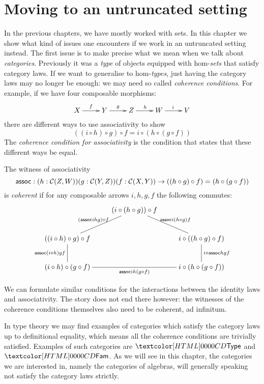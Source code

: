 \chapter{Moving to an untruncated setting}

In the previous chapters, we have mostly worked with sets. In this
chapter we show what kind of issues one encounters if we work in an
untruncated setting instead. The first issue is to make precise what
we mean when we talk about \emph{categories}. Previously it was a
\emph{type} of objects equipped with hom-\emph{sets} that satisfy
category laws. If we want to generalise to hom-\emph{types}, just
having the category laws may no longer be enough: we may need so
called \emph{coherence conditions}. For example, if we have four
composable morphisms:
$$
\xymatrix{
  X \ar[r]^{f} &Y \ar[r]^{g} &Z \ar[r]^{h} &W \ar[r]^{i} &V
}
$$
there are different ways to use associativity to show
$$
((i \circ h) \circ g) \circ f = i \circ (h \circ (g \circ f))
$$
The \emph{coherence condition for associativity} is the condition that
states that these different ways be equal.

\begin{definition}
  The witness of associativity
  $$
  \mathsf{assoc} : (h : \mathcal{C}(Z,W)) (g : \mathcal{C}(Y,Z)) (f : \mathcal{C}(X,Y)) \to ((h \circ g) \circ f) = (h \circ (g \circ f))
  $$
  is \emph{coherent} if for any composable arrows $i, h, g, f$ the
  following commutes:
  $$
  \xymatrix{
    &(i \circ (h \circ g)) \circ f \ar@{-}[dr]^{\assoc i (h \circ g) f} &\\
    ((i \circ h) \circ g) \circ f \ar@{-}[ur]^{(\assoc i h g) \circ f} \ar@{-}[d]_{\assoc (i \circ h) g f}  &&i \circ ((h \circ g) \circ f) \ar@{-}[d]^{i \circ \assoc h g f}\\
    (i \circ h) \circ (g \circ f) \ar@{-}[rr]_{\assoc i h (g \circ f)} &&i \circ (h \circ (g \circ f))
  }
  $$
\end{definition}

We can formulate similar conditions for the interactions between the
identity laws and associativity. The story does not end there however:
the witnesses of the coherence conditions themselves also need to
be coherent, ad infinitum. 

In type theory we may find examples of categories which satisfy the
category laws up to definitional equality, which means all the
coherence conditions are trivially satisfied. Examples of such
categories are $\Type$ and $\Fam$. As we will see in this chapter, the
categories we are interested in, namely the categories of algebras,
will generally speaking not satisfy the category laws strictly.

